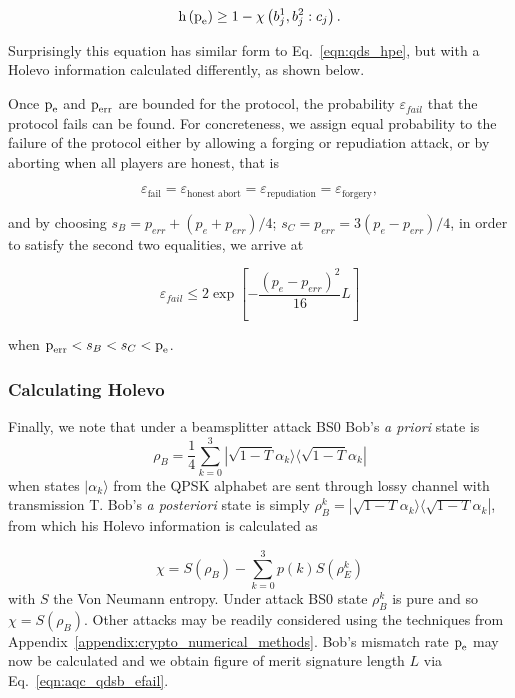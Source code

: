 \begin{equation}
\text{h}\left(\text{p}_{\text{e}}\right) \ge 1 - \chi\left(b_j^1, b_j^2 : c_j\right).
\end{equation}

\noindent Surprisingly this equation has similar form to Eq.~\ref{eqn:qds_hpe}, but with a Holevo information calculated differently, as shown below. %


Once $\text{p}_{\text{e}}$ and $\text{p}_{\text{err}}$ are bounded for the protocol, the probability $\varepsilon_{fail}$ that the protocol fails can be found. For concreteness, we assign equal probability to the failure of the protocol either by allowing a forging or repudiation attack, or by aborting when all players are honest, that is

\begin{equation*}
\varepsilon_{\text{fail}} = \varepsilon_{\text{honest abort}} = \varepsilon_{\text{repudiation}} = \varepsilon_{\text{forgery}},
\end{equation*}

\noindent and by choosing $s_B = p_{err} + \left(p_e + p_{err}\right)/4$; $s_C = p_{err} = 3\left(p_e - p_{err}\right)/4$, in order to satisfy the second two equalities, we arrive at 

\begin{equation}\label{eqn:aqc_qdsb_efail}
\varepsilon_{fail} \le 2 \exp \left[ - \frac{\left( p_e - p_{err} \right)^2}{16} L \right]
\end{equation}

\noindent when $\text{p}_{\text{err}}< s_B < s_C < \text{p}_{\text{e}}$.

\subsubsection{Calculating Holevo}

Finally, we note that under a beamsplitter attack BS$0$ Bob's \emph{a priori} state is
\begin{equation}\label{eqn:qdsb_apriori_state}
\rho_B = \frac{1}{4}\sum_{k=0}^3 |\sqrt{1-T}\alpha_k\rangle\langle\sqrt{1-T}\alpha_k|
\end{equation}
when states $|\alpha_k\rangle$ from the QPSK alphabet are sent through lossy channel with transmission T. Bob's \emph{a posteriori} state is simply $\rho_{B}^k = |\sqrt{1-T}\alpha_k\rangle\langle \sqrt{1-T}\alpha_k|$, from which his Holevo information is calculated as

\begin{equation}
\chi = S\left(\rho_B\right) - \sum_{k=0}^3 p\left(k\right) S\left(\rho_E^k\right)
\end{equation}
with $S$ the Von Neumann entropy. Under attack BS$0$ state $\rho_B^k$ is pure and so $\chi = S\left(\rho_B\right)$. Other attacks may be readily considered using the techniques from Appendix~\ref{appendix:crypto_numerical_methods}. Bob's mismatch rate $\text{p}_{\text{e}}$ may now be calculated and we obtain figure of merit signature length $L$ via Eq.~\ref{eqn:aqc_qdsb_efail}.



